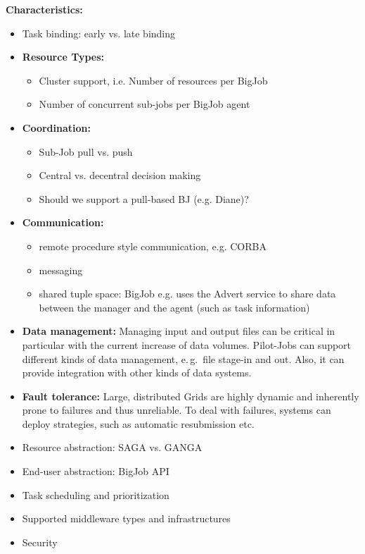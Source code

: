 \documentclass[]{article}
\begin{document}
\noindent
\textbf{Characteristics:}
\begin{itemize}
	\item Task binding: early vs. late binding
	\item \textbf{Resource Types:}
	\begin{itemize}
		\item Cluster support, i.e. Number of resources per BigJob
		\item Number of concurrent sub-jobs per BigJob agent
	\end{itemize}
	\item \textbf{Coordination:} 
	\begin{itemize}
		\item Sub-Job pull vs. push
		\item Central vs. decentral decision making
		\item Should we support a pull-based BJ (e.g. Diane)? 
	\end{itemize}	
	\item \textbf{Communication:}
	\begin{itemize}
		\item remote procedure style communication, e.g. CORBA
		\item messaging
		\item shared tuple space: BigJob e.g. uses the Advert service to share data between the manager and the agent (such as task information)
	\end{itemize} 
	\item \textbf{Data management:} Managing input and output files can be critical in particular with the current increase of data volumes. Pilot-Jobs can support different kinds of data management, e.\,g.\ file stage-in and out. Also, it can provide integration with other kinds of data systems.
	\item \textbf{Fault tolerance:} Large, distributed Grids are highly dynamic and inherently prone to failures and thus unreliable. To deal with failures, systems can deploy strategies, such as automatic resubmission etc.
	\item Resource abstraction: SAGA vs. GANGA
	\item End-user abstraction: BigJob API
	\item Task scheduling and prioritization
	\item Supported middleware types and infrastructures
	\item Security
\end{itemize}
\end{document}
